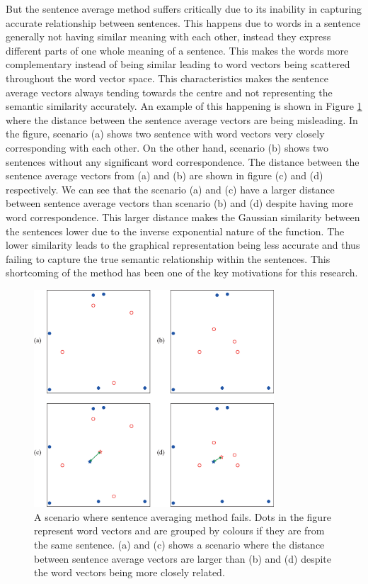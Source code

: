 \documentclass[acmlarge]{acmart}
\begin{document}
But the sentence average method suffers critically due to its inability in capturing accurate relationship between sentences. This happens due to words in a sentence generally not having similar meaning with each other, instead they express different parts of one whole meaning of a sentence. This makes the words more complementary instead of being similar leading to word vectors being scattered throughout the word vector space. This characteristics makes the sentence average vectors always tending towards the centre and not representing the semantic similarity accurately. An example of this happening is shown in Figure \ref{fig:sarkar-problem} where the distance between the sentence average vectors are being misleading. In the figure, scenario (a) shows two sentence with word vectors very closely corresponding with each other. On the other hand, scenario (b) shows two sentences without any significant word correspondence. The distance between the sentence average vectors  from (a) and (b) are shown in figure (c) and (d) respectively. We can see that the scenario (a) and (c) have a larger distance between sentence average vectors than scenario (b) and (d) despite having more word correspondence. This larger distance makes the Gaussian similarity between the sentences lower due to the inverse exponential nature of the function. The lower similarity leads to the graphical representation being less accurate and thus failing to capture the true semantic relationship within the sentences. This shortcoming of the method has been one of the key motivations for this research.

\begin{figure}
	\centering
	\includegraphics[width=0.8\textwidth]{figs/sarkar_problem-edited}
	\caption{A scenario where sentence averaging method fails. Dots in the figure represent word vectors and are grouped by colours if they are from the same sentence. (a) and (c) shows a scenario where the distance between sentence average vectors are larger than (b) and (d) despite the word vectors being more closely related.}
	\label{fig:sarkar-problem}
\end{figure}
\end{document}
